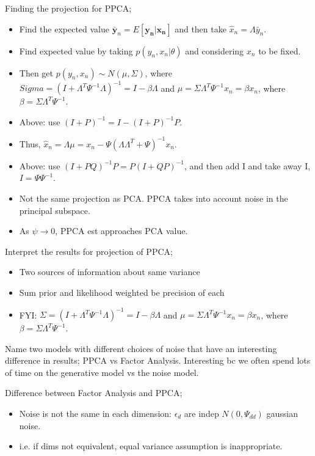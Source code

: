 \documentclass{article}
\begin{document}
Finding the projection for PPCA; \begin{itemize} \item Find the expected value $\mathbf{\bar{y}}_n=E[\mathbf{y_n|x_n}]$ and then take $\hat{x}_n=\Lambda\bar{y}_n$.  \item Find expected value by taking $p(y_n, x_n|\theta)$ and considering $x_n$ to be fixed.  \item Then get $p(y_n, x_n) \sim N(\mu, \Sigma)$, where $Sigma = (I+\Lambda^T\Psi^{-1}\Lambda)^{-1}=I-\beta\Lambda$ and $\mu=\Sigma\Lambda^T\Psi^{-1}x_n=\beta x_n$, where $\beta = \Sigma\Lambda^T\Psi^{-1}$.  \item Above: use $(I+P)^{-1}=I-(I+P)^{-1}P$.  \item Thus, $\hat{x}_n=\Lambda\mu=x_n - \Psi(\Lambda\Lambda^T+\Psi)^{-1}x_n$.  \item Above: use $(I+PQ)^{-1}P=P(I+QP)^{-1}$, and then add I and take away I, $I=\Psi\Psi^{-1}$.  \item Not the same projection as PCA. PPCA takes into account noise in the principal subspace.  \item As $\psi\rightarrow 0$, PPCA est approaches PCA value.  \end{itemize}

Interpret the results for projection of PPCA; \begin{itemize} \item Two sources of information about same variance \item Sum prior and likelihood weighted be precision of each \item FYI: $\Sigma = (I+\Lambda^T\Psi^{-1}\Lambda)^{-1}=I-\beta\Lambda$ and $\mu=\Sigma\Lambda^T\Psi^{-1}x_n=\beta x_n$, where $\beta = \Sigma\Lambda^T\Psi^{-1}$.	\end{itemize}

Name two models with different choices of noise that have an interesting difference in results; PPCA vs Factor Analysis. \newline Interesting bc we often spend lots of time on the generative model vs the noise model.

Difference between Factor Analysis and PPCA; \begin{itemize} \item Noise is not the same in each dimension: $\epsilon_d$ are indep $N(0,\Psi_{dd})$ gaussian noise.  \item i.e. if dims not equivalent, equal variance assumption is inappropriate.  \end{itemize}
\end{document}
